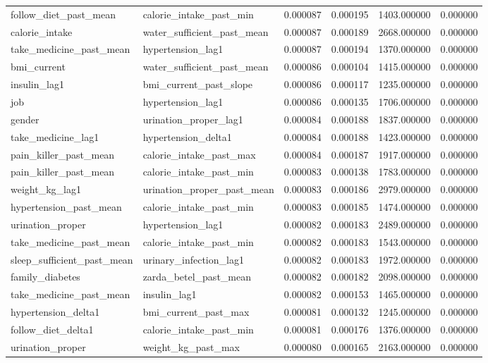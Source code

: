 \begin{longtable}{llrrrr}
follow\_diet\_past\_mean & calorie\_intake\_past\_min & 0.000087 & 0.000195 & 1403.000000 & 0.000000 \\
calorie\_intake & water\_sufficient\_past\_mean & 0.000087 & 0.000189 & 2668.000000 & 0.000000 \\
take\_medicine\_past\_mean & hypertension\_lag1 & 0.000087 & 0.000194 & 1370.000000 & 0.000000 \\
bmi\_current & water\_sufficient\_past\_mean & 0.000086 & 0.000104 & 1415.000000 & 0.000000 \\
insulin\_lag1 & bmi\_current\_past\_slope & 0.000086 & 0.000117 & 1235.000000 & 0.000000 \\
job & hypertension\_lag1 & 0.000086 & 0.000135 & 1706.000000 & 0.000000 \\
gender & urination\_proper\_lag1 & 0.000084 & 0.000188 & 1837.000000 & 0.000000 \\
take\_medicine\_lag1 & hypertension\_delta1 & 0.000084 & 0.000188 & 1423.000000 & 0.000000 \\
pain\_killer\_past\_mean & calorie\_intake\_past\_max & 0.000084 & 0.000187 & 1917.000000 & 0.000000 \\
pain\_killer\_past\_mean & calorie\_intake\_past\_min & 0.000083 & 0.000138 & 1783.000000 & 0.000000 \\
weight\_kg\_lag1 & urination\_proper\_past\_mean & 0.000083 & 0.000186 & 2979.000000 & 0.000000 \\
hypertension\_past\_mean & calorie\_intake\_past\_min & 0.000083 & 0.000185 & 1474.000000 & 0.000000 \\
urination\_proper & hypertension\_lag1 & 0.000082 & 0.000183 & 2489.000000 & 0.000000 \\
take\_medicine\_past\_mean & calorie\_intake\_past\_min & 0.000082 & 0.000183 & 1543.000000 & 0.000000 \\
sleep\_sufficient\_past\_mean & urinary\_infection\_lag1 & 0.000082 & 0.000183 & 1972.000000 & 0.000000 \\
family\_diabetes & zarda\_betel\_past\_mean & 0.000082 & 0.000182 & 2098.000000 & 0.000000 \\
take\_medicine\_past\_mean & insulin\_lag1 & 0.000082 & 0.000153 & 1465.000000 & 0.000000 \\
hypertension\_delta1 & bmi\_current\_past\_max & 0.000081 & 0.000132 & 1245.000000 & 0.000000 \\
follow\_diet\_delta1 & calorie\_intake\_past\_min & 0.000081 & 0.000176 & 1376.000000 & 0.000000 \\
urination\_proper & weight\_kg\_past\_max & 0.000080 & 0.000165 & 2163.000000 & 0.000000 \\

\end{longtable}
